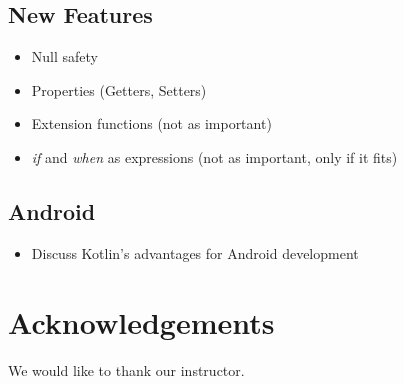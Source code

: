\documentclass[a4paper, 11pt]{article}
\begin{document}
\subsection{New Features}
\begin{itemize}
  \item Null safety
  \item Properties (Getters, Setters)
  \item Extension functions (not as important)
  \item \textit{if} and \textit{when} as expressions (not as important, only if it fits)
\end{itemize}

\subsection{Android}
\begin{itemize}
  \item Discuss Kotlin's advantages for Android development
\end{itemize}

\section*{Acknowledgements}
  We would like to thank our instructor.
\end{document}
